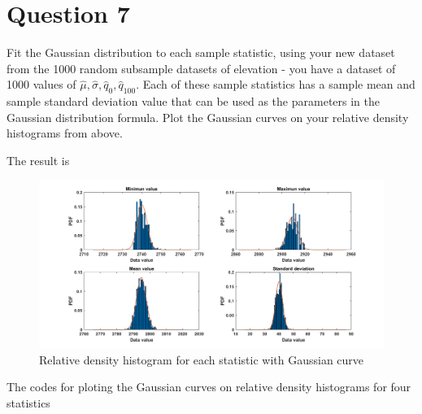 \documentclass[
	12pt, %
]{fphw}
\begin{document}

\clearpage

\section*{Question 7 }

\begin{problem}
Fit the Gaussian distribution to each sample statistic, using your new dataset from the 1000
random subsample datasets of elevation - you have a dataset of 1000 values of $\hat{\mu}, \hat{\sigma}, \hat{q}_{0}, \hat{q}_{100} $.
Each of these sample statistics has a sample mean and sample standard deviation value that
can be used as the parameters in the Gaussian distribution formula. Plot the Gaussian curves
on your relative density histograms from above.
	
\end{problem}

The result is

\begin{figure}[htbp]
	\centering
	\includegraphics[width=1\columnwidth]{RDHGausssample.png} 
	\caption{Relative density histogram for each statistic with Gaussian curve}
\end{figure}

The codes for ploting the Gaussian curves
on  relative density histograms for four statistics
\end{document}
